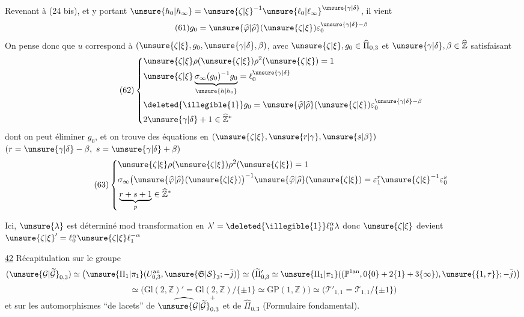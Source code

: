 Revenant à (24 bis), et y portant
$\unsure{h_0|h_\infty}=\unsure{\zeta|\xi}^{-1}\unsure{\ell_0|\ell_\infty}^{\unsure{\gamma|\delta}}$, il vient
\[
\tag{61}
g_0=\unsure{\widehat{\varphi}|\widehat{\rho}}(\unsure{\zeta|\xi})
\varepsilon_0^{\unsure{\gamma|\delta}-\beta}
\]
On pense donc que $u$ correspond à
$(\unsure{\zeta|\xi},g_0,\unsure{\gamma|\delta},\beta)$,
avec $\unsure{\zeta|\xi},g_0\in\widehat{\Pi}_{0,3}$
et $\unsure{\gamma|\delta},\beta\in\widehat{\mathbb Z}$
satisfaisant
\[
\tag{62}
\left\{
\begin{aligned}
&\unsure{\zeta|\xi}\rho(\unsure{\zeta|\xi})\rho^2(\unsure{\zeta|\xi})=1\\
&\unsure{\zeta|\xi}\underbrace{\sigma_\infty(g_0)^{-1}g_0}_{\unsure{h|h_0}}
=\ell_0^{\unsure{\gamma|\delta}}\\
&\deleted{\illegible{1}}g_0
=\unsure{\widehat{\varphi}|\widehat{\rho}}(\unsure{\zeta|\xi})
\varepsilon_0^{\unsure{\gamma|\delta}-\beta}\\
&2\unsure{\gamma|\delta}+1\in\widehat{\mathbb Z}^{*}
\end{aligned}
\right.
\]
dont on peut éliminer $g_0$, et on trouve des équations en
$(\unsure{\zeta|\xi},\unsure{r|\gamma},\unsure{s|\beta})$
$(r=\unsure{\gamma|\delta}-\beta,\ s=\unsure{\gamma|\delta}+\beta)$
\[
\tag{63}
\left\{
\begin{aligned}
&\unsure{\zeta|\xi}\rho(\unsure{\zeta|\xi})\rho^2(\unsure{\zeta|\xi})=1\\
&\sigma_\infty\bigl(\unsure{\widehat{\varphi}|\widehat{\rho}}(\unsure{\zeta|\xi})\bigr)^{-1}
\unsure{\widehat{\varphi}|\widehat{\rho}}(\unsure{\zeta|\xi})
=\varepsilon_1^r\unsure{\zeta|\xi}^{-1}\varepsilon_0^s\\
&\underbrace{r+s+1}_{p}\in\widehat{\mathbb Z}^{*}
\end{aligned}
\right.
\]

Ici, $\unsure{\lambda}$ est déterminé mod transformation en
$\lambda'=\deleted{\illegible{1}}\ell_0^\alpha\lambda$
donc $\unsure{\zeta|\xi}$ devient
$\unsure{\zeta|\xi}'=\ell_0^\alpha\unsure{\zeta|\xi}\ell_1^{-\alpha}$



\uline{42} Récapitulation sur le groupe
\[
(\unsure{\mathcal G|\widetilde{\mathcal G}}_{0,3})
\simeq
\bigl(\unsure{\Pi_1|\pi_1}(U_{0,3}^{\mathrm{an}},\unsure{\mathfrak S|\mathcal S}_3;-\bar j)\bigr)
\simeq
\bigl(\widetilde\Pi'_{0,3}\simeq
\unsure{\Pi_1|\pi_1}((\mathbb P^{1\mathrm{an}},0\{0\}+2\{1\}+3\{\infty\}),\unsure{\{1,\tau\}};-\bar j)\bigr)
\]
\[
\simeq\bigl(\mathrm{Gl}(2,\mathbb Z)'=\mathrm{Gl}(2,\mathbb Z)/\{\pm1\}
\simeq\mathrm{GP}(1,\mathbb Z)\bigr)
\simeq\bigl(\mathcal T'_{1,1}=\mathcal T_{1,1}/\{\pm1\}\bigr)
\]
et sur les automorphismes ``de lacets'' de
$\widehat{\unsure{\mathcal G|\widetilde{\mathcal G}}}_{0,3}^{+}$ et de
$\widehat\Pi_{0,3}$ (Formulaire fondamental).

